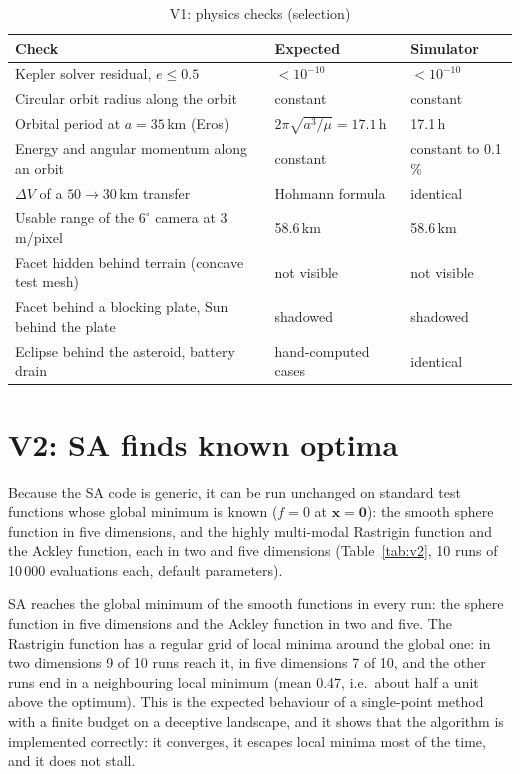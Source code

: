 \begin{table}[htbp]
\centering
\caption{V1: physics checks (selection)}
\label{tab:v1}
\footnotesize
\begin{tabularx}{\textwidth}{@{}Xp{4.0cm}p{2.6cm}@{}}
\toprule
Check & Expected & Simulator \\
\midrule
Kepler solver residual, $e\le0.5$ & $<10^{-10}$ & $<10^{-10}$ \\
Circular orbit radius along the orbit & constant & constant \\
Orbital period at $a=35$\,km (Eros) & $2\pi\sqrt{a^3/\mu}=17.1$\,h & 17.1\,h \\
Energy and angular momentum along an orbit & constant & constant to 0.1\,\% \\
$\Delta V$ of a $50\rightarrow30$\,km transfer & Hohmann formula & identical \\
Usable range of the $6^\circ$ camera at 3\,m/pixel & 58.6\,km & 58.6\,km \\
Facet hidden behind terrain (concave test mesh) & not visible & not visible \\
Facet behind a blocking plate, Sun behind the plate & shadowed & shadowed \\
Eclipse behind the asteroid, battery drain & hand-computed cases & identical \\
\bottomrule
\end{tabularx}
\end{table}

\section{V2: SA finds known optima}
\label{sec:v2}
Because the \ac{SA} code is generic, it can be run unchanged on standard test functions whose global
minimum is known ($f=0$ at $\mathbf{x}=\mathbf{0}$): the smooth sphere function in five dimensions,
and the highly multi-modal Rastrigin function and the Ackley function, each in two and five dimensions
(Table~\ref{tab:v2}, 10 runs of 10\,000 evaluations each, default parameters).



\ac{SA} reaches the global minimum of the smooth functions in every run: the sphere function in five
dimensions and the Ackley function in two and five. The Rastrigin function has a regular grid of local minima around the global one: in two dimensions 9 of 10 runs reach it, in five
dimensions 7 of 10, and the other runs end in a neighbouring local minimum (mean 0.47, i.e.\ about
half a unit above the optimum). This is the expected behaviour of a single-point method with a
finite budget on a deceptive landscape, and it shows that the algorithm is implemented correctly:
it converges, it escapes local minima most of the time, and it does not stall.


